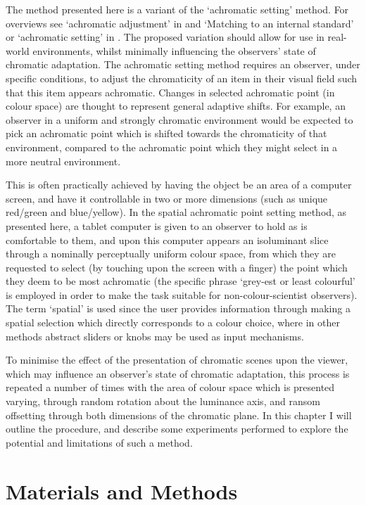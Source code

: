 The method presented here is a variant of the `achromatic setting' method. For overviews see `achromatic adjustment' in \citet{foster_color_2011} and `Matching to an internal standard' or `achromatic setting' in \citet{smithson_sensory_2005}. The proposed variation should allow for use in real-world environments, whilst minimally influencing the observers’ state of chromatic adaptation. The achromatic setting method requires an observer, under specific conditions, to adjust the chromaticity of an item in their visual field such that this item appears achromatic. Changes in selected achromatic point (in colour space) are thought to represent general adaptive shifts. For example, an observer in a uniform and strongly chromatic environment would be expected to pick an achromatic point which is shifted towards the chromaticity of that environment, compared to the achromatic point which they might select in a more neutral environment. 

This is often practically achieved by having the object be an area of a computer screen, and have it controllable in two or more dimensions (such as unique red/green and blue/yellow). 
In the spatial achromatic point setting method, as presented here, a tablet computer is given to an observer to hold as is comfortable to them, and upon this computer appears an isoluminant slice through a nominally perceptually uniform colour space, from which they are requested to select (by touching upon the screen with a finger) the point which they deem to be most achromatic (the specific phrase `grey-est or least colourful' is employed in order to make the task suitable for non-colour-scientist observers). The term ‘spatial’ is used since the user provides information through making a spatial selection which directly corresponds to a colour choice, where in other methods abstract sliders or knobs may be used as input mechanisms.

To minimise the effect of the presentation of chromatic scenes upon the viewer, which may influence an observer’s state of chromatic adaptation, this process is repeated a number of times with the area of colour space which is presented varying, through random rotation about the luminance axis, and ransom offsetting through both dimensions of the chromatic plane.
In this chapter I will outline the procedure, and describe some experiments performed to explore the potential and limitations of such a method.

\section{Materials and Methods}
